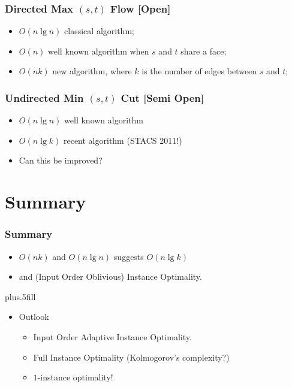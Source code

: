 \documentclass{beamer}
\begin{document}
\begin{TOKEEPSECRET}
  \begin{frame}
    \frametitle{Directed Max $(s,t)$ Flow [Open]}
    \begin{itemize}
    \item $O(n\lg n)$ classical algorithm;
    \item $O(n)$ well known algorithm when $s$ and $t$ share a face;
    \item $O(nk)$ new algorithm, where $k$ is the number of edges
      between $s$ and $t$;
    \end{itemize}
  \end{frame}

  \begin{frame}
    \frametitle{Undirected Min $(s,t)$ Cut [Semi Open]}
    \begin{itemize}
    \item $O(n\lg n)$ well known algorithm
    \item $O(n\lg k)$ recent algorithm (STACS 2011!)
    \item Can this be improved?
    \end{itemize}
  \end{frame}
\end{TOKEEPSECRET}

\section*{Summary}

\begin{frame}
  \frametitle<presentation>{Summary}

  \begin{itemize}
  \item $O(nk)$ and $O(n\lg n)$ suggests $O(n\lg k)$
  \item and (Input Order Oblivious) \alert{Instance Optimality}.
  \end{itemize}
  
  \vskip0pt plus.5fill
  \begin{itemize}
  \item
    Outlook
    \begin{itemize}
    \item Input Order Adaptive Instance Optimality.
    \item Full Instance Optimality (Kolmogorov's complexity?)
    \item $1$-instance optimality!
    \end{itemize}
  \end{itemize}
\end{frame}
\end{document}

